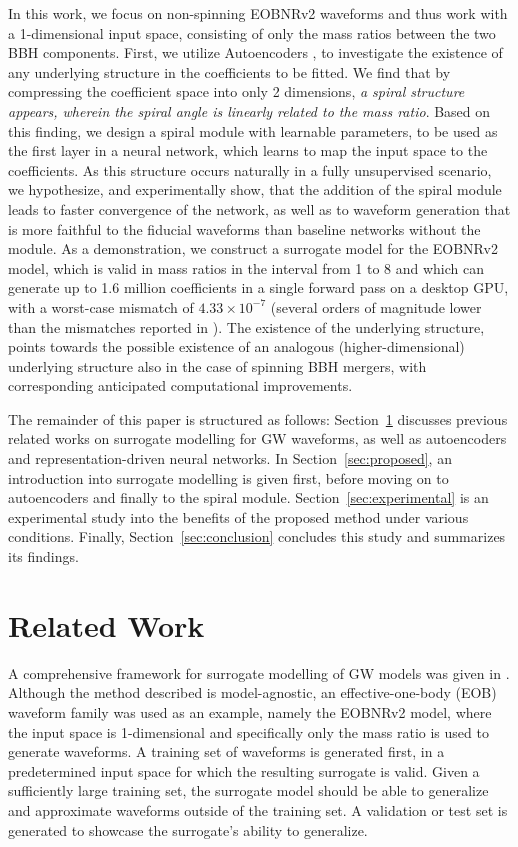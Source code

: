 \documentclass[preprint,12pt]{elsarticle}
\begin{document}
In this work, we focus on non-spinning  EOBNRv2 waveforms and thus work with a 1-dimensional input space, consisting of only the mass ratios between the two BBH components. First, we utilize Autoencoders \cite{nousi2017deep}, to investigate the existence of any underlying structure in the coefficients to be fitted. We find that by compressing the coefficient space into only 2 dimensions, {\it a spiral structure appears, wherein the spiral angle is linearly related to the mass ratio}. Based on this finding, we design a spiral module with learnable parameters, to be used as the first layer in a neural network, which learns to map the input space to the coefficients. As this structure occurs naturally in a fully unsupervised scenario, we hypothesize, and experimentally show, that the addition of the spiral module leads to faster convergence of the network, as well as to waveform generation that is more faithful to the fiducial waveforms than baseline networks without the module. As a demonstration, we construct a surrogate model for the EOBNRv2 model, which is valid in mass ratios in the interval from 1 to 8 and which can generate up to 1.6 million coefficients in a single forward pass on a desktop GPU, with a worst-case mismatch of $4.33\times 10^{-7}$ (several orders of magnitude lower than the mismatches reported in \cite{bohe2017improved}). The existence of the underlying structure, points towards the possible existence of an analogous (higher-dimensional) underlying structure also in the case of spinning BBH mergers, with corresponding anticipated computational improvements.

The remainder of this paper is structured as follows: Section~\ref{sec:related} discusses previous related works on surrogate modelling for GW waveforms, as well as autoencoders and representation-driven neural networks. In Section~\ref{sec:proposed}, an introduction into surrogate modelling is given first, before moving on to autoencoders and finally to the spiral module. Section~\ref{sec:experimental} is an experimental study into the benefits of the proposed method under various conditions. Finally, Section~\ref{sec:conclusion} concludes this study and summarizes its findings.

\section{Related Work}
\label{sec:related}

A comprehensive framework for surrogate modelling of GW models was given in \cite{field2014fast}. Although the method described is model-agnostic, an effective-one-body (EOB) waveform family was used as an example, namely the EOBNRv2 \cite{pan2011inspiral} model, where the input space is 1-dimensional and specifically only the mass ratio is used to generate waveforms. A training set of waveforms is generated first, in a predetermined input space for which the resulting surrogate is valid. Given a sufficiently large training set, the surrogate model should be able to generalize and approximate waveforms outside of the training set. A validation or test set is generated to showcase the surrogate's ability to generalize.
\end{document}
